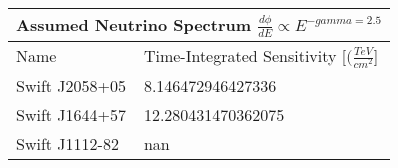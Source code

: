 \documentclass[]{article}
\begin{document}
\begin{tabular}{ |p{3.5cm}||p{4.5cm}|} 
\hline 
\multicolumn{2}{|c|}{Assumed Neutrino Spectrum $ \frac {d \phi}{dE} \propto E ^ {-gamma=2.5} $} \\ 
\hline 
Name&Time-Integrated Sensitivity [$ (\frac{TeV}{cm^{2}} $] \\ 
\hline 
Swift J2058+05 & \num[round-precision=2, round-mode=figures, scientific-notation=true]{8.146472946427336}  \\ 
Swift J1644+57 & \num[round-precision=2, round-mode=figures, scientific-notation=true]{12.280431470362075}  \\ 
Swift J1112-82 & \num[round-precision=2, round-mode=figures, scientific-notation=true]{nan}  \\ 
\hline 
\end{tabular} 
\end{document}
